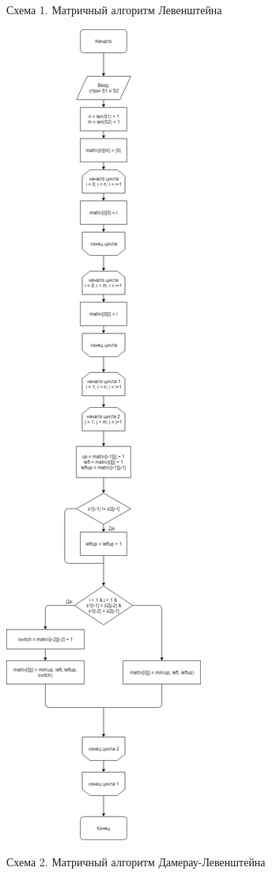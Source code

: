 \documentclass[12pt]{report}
\begin{document}
\begin{center}
    Схема 1. Матричный алгоритм Левенштейна
\end{center}

\begin{center}
    \includegraphics[scale=0.25]{dam_lev_mtr}

    Схема 2. Матричный алгоритм Дамерау-Левенштейна
\end{center}
\end{document}
